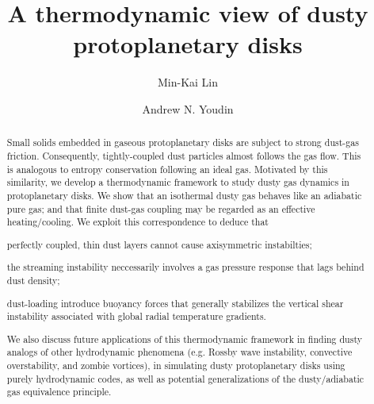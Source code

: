 \documentclass[iop, numberedappendix]{emulateapj}
\begin{document}
\title{A thermodynamic view of dusty protoplanetary disks}
\author{Min-Kai Lin}
\author{Andrew N. Youdin}

\begin{abstract}
  Small solids embedded in gaseous protoplanetary disks are subject
  to strong dust-gas friction. Consequently, tightly-coupled dust
  particles almost follows the gas flow. 
  This is analogous to entropy conservation
  following an ideal gas.   
  Motivated by this similarity, we develop a thermodynamic 
  framework to study dusty gas dynamics in protoplanetary disks. We  
  show that an isothermal dusty gas behaves like an  
  adiabatic pure gas; and that finite dust-gas coupling may be
  regarded as an effective 
  heating/cooling. We exploit this correspondence 
  to deduce that   
\begin{inparaenum}[1)] 
\item 
 perfectly coupled, thin dust layers cannot cause axisymmetric 
 instabilties; 
\item 
  the streaming instability neccessarily involves a gas pressure
  response 
  that lags behind dust density; 
\item dust-loading introduce buoyancy forces that generally 
  stabilizes the vertical shear 
  instability associated with global radial temperature gradients. 
\end{inparaenum}  
We also discuss future applications of this thermodynamic framework in
finding dusty analogs of other hydrodynamic 
phenomena (e.g. Rossby wave instability, convective overstability, and 
zombie vortices), in simulating dusty protoplanetary disks
using purely hydrodynamic codes, as well as potential generalizations
of the dusty/adiabatic gas equivalence principle. 


\end{abstract}
\end{document}
